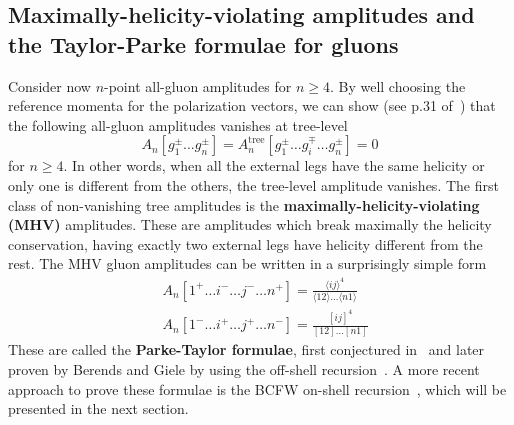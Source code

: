 \subsection*{Maximally-helicity-violating amplitudes and the Taylor-Parke formulae for gluons}
Consider now $n$-point all-gluon amplitudes for $n\geq 4$. 
By well choosing the reference momenta for the polarization vectors, we can show (see p.31 of~\cite{Elvang:2013cua}) that the following all-gluon amplitudes vanishes at tree-level
\begin{equation}
A_n[g_1^\pm \ldots g_n^\pm] = A^{\mathrm{tree}}_n[g_1^\pm \ldots g_i^\mp \ldots g_n^\pm] = 0
\end{equation}
for $n\geq 4$.
In other words, when all the external legs have the same helicity or only one is different from the others, the tree-level amplitude vanishes.
The first class of non-vanishing tree amplitudes is the \textbf{maximally-helicity-violating (MHV)} amplitudes.
These are amplitudes which break maximally the helicity conservation, having exactly two external legs have helicity different from the rest.
The MHV gluon amplitudes can be written in a surprisingly simple form
\begin{equation}\label{parke-taylor}
\begin{split}
& A_n[1^+\ldots i^-\ldots j^-\ldots n^+] = 
\frac{\langle ij \rangle^4}{\langle 12 \rangle\ldots \langle n1 \rangle}
\\
& A_n[1^-\ldots i^+\ldots j^+\ldots n^-] = 
\frac{[ ij]^4}{[ 12 ]\ldots [n1 ]}
\end{split}
\end{equation}
These are called the \textbf{Parke-Taylor formulae}, first conjectured in~\cite{PhysRevLett.56.2459} and later proven by Berends and Giele by using the off-shell recursion~\cite{BERENDS1988759}. 
A more recent approach to prove these formulae is the BCFW on-shell recursion~\cite{BRITTO2005499, PhysRevLett.94.181602}, which will be presented in the next section. 






